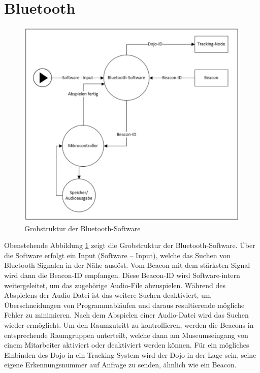 \section{Bluetooth}

\begin{figure}[H]
\begin{center}
	\includegraphics[width=120mm]{data/Bluetooth.png}
	\caption{Grobstruktur der Bluetooth-Software} %
	\label{fig:Grobstruktur_Bluetooth}
\end{center}
\end{figure}

Obenstehende Abbildung \ref*{fig:Grobstruktur_Bluetooth} zeigt die Grobstruktur der Bluetooth-Software. Über die Software erfolgt ein Input (Software – Input), welche das Suchen von Bluetooth Signalen in der Nähe auslöst. Vom Beacon mit dem stärksten Signal wird dann die Beacon-ID empfangen. Diese Beacon-ID wird Software-intern weitergeleitet, um das zugehörige Audio-File abzuspielen. Während des Abspielens der Audio-Datei ist das weitere Suchen deaktiviert, um Überschneidungen von Programmabläufen und daraus resultierende mögliche Fehler zu minimieren. Nach dem Abspielen einer Audio-Datei wird das Suchen wieder ermöglicht. Um den Raumzutritt zu kontrollieren, werden die Beacons in entsprechende Raumgruppen unterteilt, welche dann am Museumseingang von einem Mitarbeiter aktiviert oder deaktiviert werden können. Für ein mögliches Einbinden des Dojo in ein Tracking-System wird der Dojo in der Lage sein, seine eigene Erkennungsnummer auf Anfrage zu senden, ähnlich wie ein Beacon.
